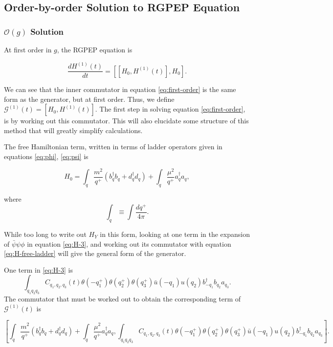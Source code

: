 \subsection{Order-by-order Solution to RGPEP Equation}
\subsubsection{$\mathcal{O}(g)$ Solution}
\label{sec:first-order}
At first order in $g$, the RGPEP equation is 

\begin{equation}
    \label{eq:first-order}
    \frac{dH^{(1)}(t)}{dt} = \left[\left[H_0, H^{(1)}(t) \right], H_0 \right].
\end{equation}

We can see that the inner commutator in equation \ref{eq:first-order} is the same form as the generator, but at first order. 
Thus, we define $\mathcal{G}^{(1)}(t) = \left[H_0,  H^{(1)}(t)\right]$.
The first step in solving equation \ref{eq:first-order}, is by working out this commutator. 
This will also elucidate some structure of this method that will greatly simplify calculations.

The free Hamiltonian term, written in terms of ladder operators given in equations \ref{eq:phi}, \ref{eq:psi} is 

\begin{equation}
    \label{eq:H-free-ladder}
    H_0 = \int_q \frac{m^2}{q^+}\left(b_q^\dagger b_q + d_q^\dagger d_q \right) + \int_q \frac{\mu^2}{q^+}a_q^\dagger a_q,
\end{equation}

where $$\int_q \equiv \int \frac{dq^+}{4\pi}.$$

While too long to write out $H_Y$ in this form, looking at one term in the expansion of $\bar \psi \psi \phi$ in equation \ref{eq:H-3}, and working out its commutator with equation \ref{eq:H-free-ladder} will give the general form of the generator.

One term in \ref{eq:H-3} is $$\int_{q_1 q_2 q_3}C_{q_1, q_2, q_3}(t)\theta(-q_1^+)\theta(q_2^+)\theta(q_3^+) \bar u(-q_1) u(q_2) b_{-q_1}^\dagger b_{q_2} a_{q_3}.$$
The commutator that must be worked out to obtain the corresponding term of $\mathcal{G}^{(1)}(t)$ is

$$
    \left[\int_q \frac{m^2}{q^+}\left(b_q^\dagger b_q + d_q^\dagger d_q \right) + \int_q \frac{\mu^2}{q^+}a_q^\dagger a_q,  \int_{q_1 q_2 q_3}C_{q_1, q_2, q_3}(t)\theta(-q_1^+)\theta(q_2^+)\theta(q_3^+) \bar u(-q_1) u(q_2) b_{-q_1}^\dagger b_{q_2} a_{q_3}\right].
$$

